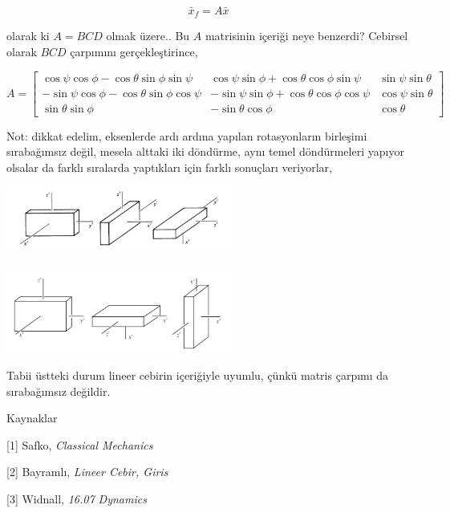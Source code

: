 \documentclass[12pt,fleqn]{article}\usepackage{../../common}
\begin{document}
$$
\bar{x}_f =  A \bar{x}
$$

olarak ki $A = BCD$ olmak üzere.. Bu $A$ matrisinin içeriği neye benzerdi? Cebirsel
olarak $BCD$ çarpımını gerçekleştirince,

$$
A = \left[\begin{array}{ccc}
\cos\psi\cos\phi-\cos\theta\sin\phi\sin\psi &
\cos\psi\sin\phi + \cos\theta\cos\phi\sin\psi &
\sin\psi\sin\theta \\
-\sin\psi\cos\phi-\cos\theta\sin\phi\cos\psi &
-\sin\psi\sin\phi + \cos\theta\cos\phi\cos\psi &
\cos\psi\sin\theta \\
\sin\theta \sin\phi &
-\sin\theta\cos\phi &
\cos\theta
\end{array}\right]
$$

Not: dikkat edelim, eksenlerde ardı ardına yapılan rotasyonların birleşimi
sırabağımsız değil, mesela alttaki iki döndürme, aynı temel döndürmeleri
yapıyor olsalar da farklı sıralarda yaptıkları için farklı sonuçları veriyorlar,

\includegraphics[width=20em]{phy_072_rot_01.png}

\includegraphics[width=20em]{phy_072_rot_02.png}

Tabii üstteki durum lineer cebirin içeriğiyle uyumlu, çünkü matris çarpımı da
sırabağımsız değildir.

Kaynaklar

[1] Safko, {\em Classical Mechanics}

[2] Bayramlı, {\em Lineer Cebir, Giris}

[3] Widnall, {\em 16.07 Dynamics}
\end{document}
